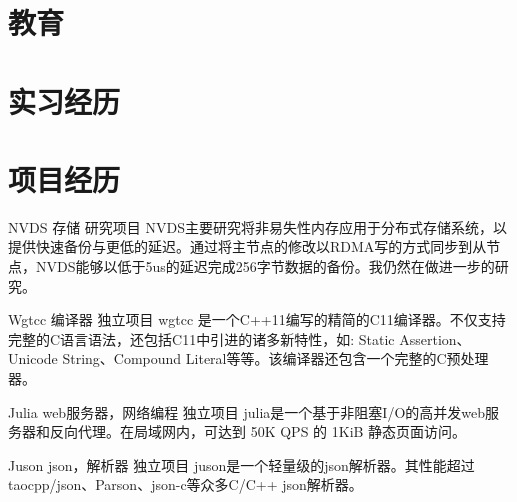 \documentclass[11pt,a4paper]{moderncv}
\title{}               %
\begin{document}
\maketitle

\section{教育}

\section{实习经历}

\section{项目经历}
\renewcommand{\baselinestretch}{1.2}

{NVDS}
{存储}
{研究项目}{}
{NVDS主要研究将非易失性内存应用于分布式存储系统，以提供快速备份与更低的延迟。通过将主节点的修改以RDMA写的方式同步到从节点，NVDS能够以低于5us的延迟完成256字节数据的备份。我仍然在做进一步的研究。}

{Wgtcc}
{编译器}
{独立项目}{}
{wgtcc 是一个C++11编写的精简的C11编译器。不仅支持完整的C语言语法，还包括C11中引进的诸多新特性，如: Static Assertion、Unicode String、Compound Literal等等。该编译器还包含一个完整的C预处理器。}

\vspace*{0.2\baselineskip}
{Julia}
{web服务器，网络编程}
{独立项目}{}
{julia是一个基于非阻塞I/O的高并发web服务器和反向代理。在局域网内，可达到 50K QPS 的 1KiB 静态页面访问。}

\vspace*{0.2\baselineskip}
{Juson}
{json，解析器}
{独立项目}{}
{juson是一个轻量级的json解析器。其性能超过 taocpp/json、Parson、json-c等众多C/C++ json解析器。}

\end{document}
